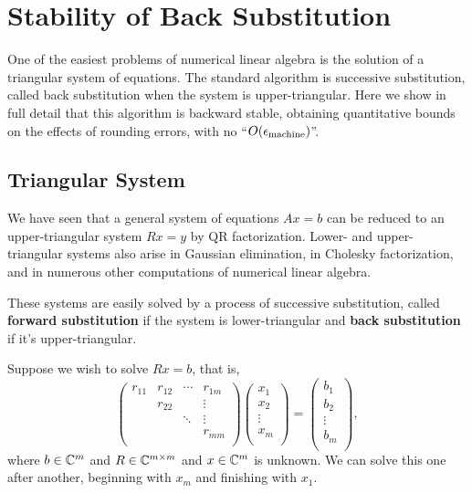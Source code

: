 \chapter{Stability of Back Substitution} 
One of the easiest problems of numerical linear algebra is the solution of a triangular system of equations. The standard algorithm is successive substitution, called back substitution when the system is upper-triangular. Here we show in full detail that this algorithm is backward stable, obtaining quantitative bounds on the effects of rounding errors, with no ``$O(\epsilon_{\text{machine}})$''.

\section{Triangular System}

We have seen that a general system of equations $Ax=b$ can be reduced to an upper-triangular system $Rx=y$ by QR factorization.  Lower- and upper- triangular systems also arise in Gaussian elimination, in Cholesky factorization, and in numerous other computations of numerical linear algebra.  

These systems are easily solved by a process of successive substitution, called \textbf{forward substitution} if the system is lower-triangular and \textbf{back substitution} if it's upper-triangular.  

Suppose we wish to solve $Rx=b$, that is, 
\begin{equation}
    \label{eq: back sub} 
    \begin{pmatrix}
        r_{ 11 }  & r_{ 12 }  & \cdots &  r_{ 1m }  \\
         & r_{ 22 }  &  &  \vdots \\
         &  & \ddots &  \vdots \\
         &  &  &  r_{mm} \\
    \end{pmatrix} \begin{pmatrix}
         x_1 \\
         x_2 \\
         \vdots \\
         x_m \\
    \end{pmatrix} = \begin{pmatrix}
         b_1 \\
         b_2 \\
         \vdots \\
         b_m \\
    \end{pmatrix},   
\end{equation}
where $b\in \mathbb{C}^m$ and $R \in \mathbb{C}^{m\times m}$ and $x\in \mathbb{C}^m$ is unknown.  We can solve this one after another, beginning with $x_m$ and finishing with $x_1$. 

